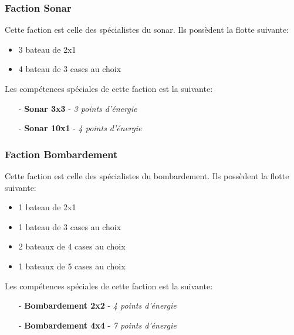 \documentclass[../besoin_user.tex]{subfiles}
\begin{document}
\subsubsection{Faction Sonar}
Cette faction est celle des spécialistes du sonar. Ils possèdent la flotte suivante:
\begin{itemize}
    \item 3 bateau de 2x1
    \item 4 bateau de 3 cases au choix
\end{itemize}

Les compétences spéciales de cette faction est la suivante:
\begin{itemize}
    \item[-] \textbf{Sonar 3x3} - \textit{3 points d'énergie}
    \item[-] \textbf{Sonar 10x1} - \textit{4 points d'énergie} 
\end{itemize}

\subsubsection{Faction Bombardement}
Cette faction est celle des spécialistes du bombardement. Ils possèdent la flotte suivante:
\begin{itemize}
    \item 1 bateau de 2x1
    \item 1 bateau de 3 cases au choix
    \item 2 bateaux de 4 cases au choix
    \item 1 bateaux de 5 cases au choix
\end{itemize}

Les compétences spéciales de cette faction est la suivante:
\begin{itemize}
    \item[-] \textbf{Bombardement 2x2} - \textit{4 points d'énergie}
    \item[-] \textbf{Bombardement 4x4} - \textit{7 points d'énergie}
\end{itemize}
\end{document}

